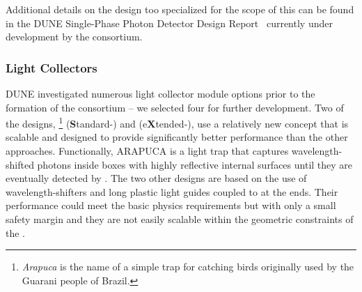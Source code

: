 Additional details on the design too specialized for the scope of this  can be found in the DUNE Single-Phase Photon Detector Design Report~  
 currently under development by the consortium. 


\subsubsection{Light Collectors} 
\label{sssec:photoncollectors}

DUNE investigated numerous  light collector module options prior to the formation of the \single {} consortium -- we selected four for further development. 
Two of the designs, \footnote{\textit{Arapuca} is the name of a simple trap for catching birds originally used by the Guarani people of Brazil.} (\textbf{S}tandard-) and  (e\textbf{X}tended-), use a relatively new concept that is scalable and designed to provide  
significantly better performance than the other approaches. Functionally, ARAPUCA is a light trap that captures wavelength-shifted photons inside boxes with highly reflective internal surfaces until they are eventually detected by .  The two other designs are based on the use of wavelength-shifters and long plastic light guides coupled to  at the ends. Their performance could meet the basic physics requirements but with only a small safety margin and they are not easily scalable within the geometric constraints of the . 


